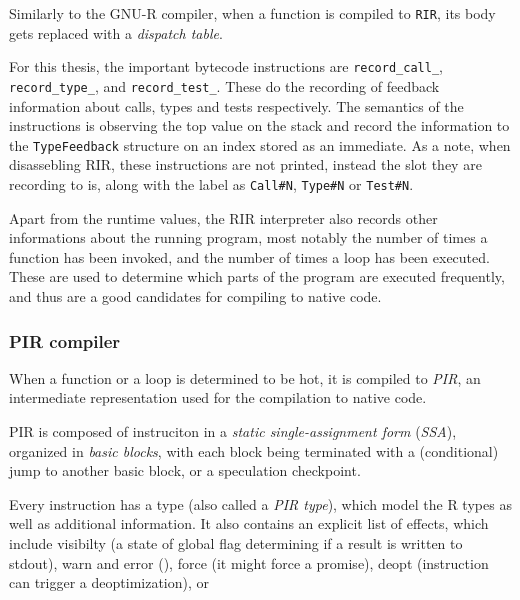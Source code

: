 Similarly to the GNU-R compiler, when a function is compiled to \texttt{RIR}, its body gets replaced with a \textit{dispatch table}.


For this thesis, the important bytecode instructions are \texttt{record\_call\_}, \texttt{record\_type\_}, and \texttt{record\_test\_}. These do the recording of feedback information about calls, types and tests respectively. The semantics of the instructions is observing the top value on the stack and record the information to the \texttt{TypeFeedback} structure on an index stored as an immediate. As a note, when disassebling RIR, these instructions are not printed, instead the slot they are recording to is, along with the label as \texttt{Call\#N}, \texttt{Type\#N} or \texttt{Test\#N}.

Apart from the runtime values, the RIR interpreter also records other informations about the running program, most notably the number of times a function has been invoked, and the number of times a loop has been executed. These are used to determine which parts of the program are executed frequently, and thus are a good candidates for compiling to native code.

\subsubsection*{PIR compiler}
When a function or a loop is determined to be hot, it is compiled to \textit{PIR}, an intermediate representation used for the compilation to native code.

PIR is composed of instruciton in a \textit{static single-assignment form} (\textit{SSA}), organized in \textit{basic blocks}, with each block being terminated with a (conditional) jump to another basic block, or a speculation checkpoint.

Every instruction has a type (also called a \textit{PIR type}), which model the R types as well as additional information. It also contains an explicit list of effects, which include visibilty (a state of global flag determining if a result is written to stdout), warn and error (\todo{\dots}), force (it might force a promise), deopt (instruction can trigger a deoptimization), or



